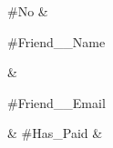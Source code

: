 #No &
\begin{minipage}[c]{5cm}#Friend__Name\end{minipage}
&
  \begin{minipage}[c]{7cm}\small{#Friend__Email}\end{minipage}
&
  \small{#Has_Paid}
&
\begin{minipage}[t]{7cm}\hspace{1cm}\\\hspace{7cm}\end{minipage}\\
\hline
